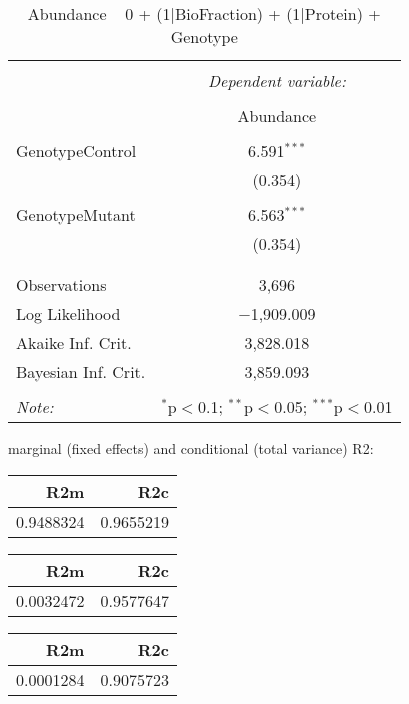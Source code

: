 \documentclass[11pt]{report}
\begin{document}
\begin{table}[!htbp] \centering 
  \caption{Abundance ~ 0 + (1|BioFraction) + (1|Protein) + Genotype} 
  \label{} 
\begin{tabular}{@{\extracolsep{5pt}}lc} 
\\[-1.8ex]\hline 
\hline \\[-1.8ex] 
 & \multicolumn{1}{c}{\textit{Dependent variable:}} \\ 
\cline{2-2} 
\\[-1.8ex] & Abundance \\ 
\hline \\[-1.8ex] 
 GenotypeControl & 6.591$^{***}$ \\ 
  & (0.354) \\ 
  & \\ 
 GenotypeMutant & 6.563$^{***}$ \\ 
  & (0.354) \\ 
  & \\ 
\hline \\[-1.8ex] 
Observations & 3,696 \\ 
Log Likelihood & $-$1,909.009 \\ 
Akaike Inf. Crit. & 3,828.018 \\ 
Bayesian Inf. Crit. & 3,859.093 \\ 
\hline 
\hline \\[-1.8ex] 
\textit{Note:}  & \multicolumn{1}{r}{$^{*}$p$<$0.1; $^{**}$p$<$0.05; $^{***}$p$<$0.01} \\ 
\end{tabular} 
\end{table} 
marginal (fixed effects) and conditional (total variance) R2:

\begin{tabular}{r|r}
\hline
R2m & R2c\\
\hline
0.9488324 & 0.9655219\\
\hline
\end{tabular}

\begin{tabular}{r|r}
\hline
R2m & R2c\\
\hline
0.0032472 & 0.9577647\\
\hline
\end{tabular}

\begin{tabular}{r|r}
\hline
R2m & R2c\\
\hline
0.0001284 & 0.9075723\\
\hline
\end{tabular}
\end{document}
